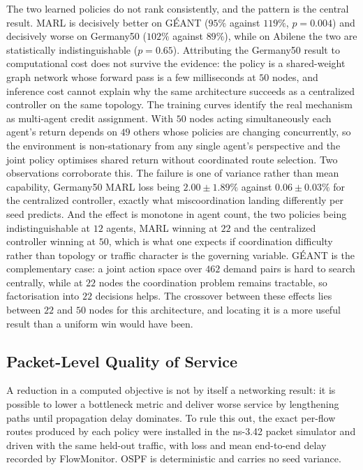 The two learned policies do not rank consistently, and the pattern is the
central result. MARL is decisively better on GÉANT ($95\%$ against $119\%$,
$p=0.004$) and decisively worse on Germany50 ($102\%$ against $89\%$), while on
Abilene the two are statistically indistinguishable ($p=0.65$). Attributing the
Germany50 result to computational cost does not survive the evidence: the policy
is a shared-weight graph network whose forward pass is a few milliseconds at
$50$ nodes, and inference cost cannot explain why the same architecture succeeds
as a centralized controller on the same topology. The training curves identify
the real mechanism as multi-agent credit assignment. With $50$ nodes acting
simultaneously each agent's return depends on $49$ others whose policies are
changing concurrently, so the environment is non-stationary from any single
agent's perspective and the joint policy optimises shared return without
coordinated route selection. Two observations corroborate this. The failure is
one of variance rather than mean capability, Germany50 MARL loss being $2.00 \pm
1.89\%$ against $0.06 \pm 0.03\%$ for the centralized controller, exactly what
miscoordination landing differently per seed predicts. And the effect is
monotone in agent count, the two policies being indistinguishable at $12$
agents, MARL winning at $22$ and the centralized controller winning at $50$,
which is what one expects if coordination difficulty rather than topology or
traffic character is the governing variable. GÉANT is the complementary case: a
joint action space over $462$ demand pairs is hard to search centrally, while at
$22$ nodes the coordination problem remains tractable, so factorisation into
$22$ decisions helps. The crossover between these effects lies between $22$ and
$50$ nodes for this architecture, and locating it is a more useful result than a
uniform win would have been.

\subsection{Packet-Level Quality of Service}
\label{sec:res-qos}

A reduction in a computed objective is not by itself a networking result: it is
possible to lower a bottleneck metric and deliver worse service by lengthening
paths until propagation delay dominates. To rule this out, the exact per-flow
routes produced by each policy were installed in the ns-3.42 packet simulator
and driven with the same held-out traffic, with loss and mean end-to-end delay
recorded by FlowMonitor. OSPF is deterministic and carries no seed variance.

